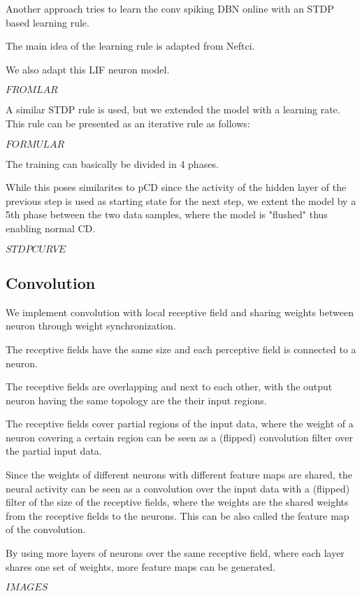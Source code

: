 Another approach tries to learn the conv spiking DBN online with an STDP based learning rule. 

The main idea of the learning rule is adapted from Neftci.

We also adapt this LIF neuron model.

$FROMLAR$

A similar STDP rule is used, but we extended the model with a learning rate. 
This rule can be presented as an iterative rule as follows:

$FORMULAR$

The training can basically be divided in 4 phases. 

While this poses similarites to pCD since the activity of the hidden layer of the previous step is used as starting state for the next step, we extent the model by a 5th phase between the two data samples, where the model is "flushed" thus enabling normal CD.

$STDP CURVE$

\subsection{Convolution}

We implement convolution with local receptive field and sharing weights between neuron through weight synchronization.

The receptive fields have the same size and each perceptive field is connected to a neuron. 

The receptive fields are overlapping and next to each other, with the output neuron having the same topology are the their input regions. 

The receptive fields cover partial regions of the input data, where the weight of a neuron covering a certain region can be seen as a (flipped) convolution filter over the partial input data.

Since the weights of different neurons with different feature maps are shared, the neural activity can be seen as a convolution over the input data with a (flipped) filter of the size of the receptive fields, where the weights are the shared weights from the receptive fields to the neurons.
This can be also called the feature map of the convolution.

By using more layers of neurons over the same receptive field, where each layer shares one set of weights, more feature maps can be generated.

$IMAGES$

